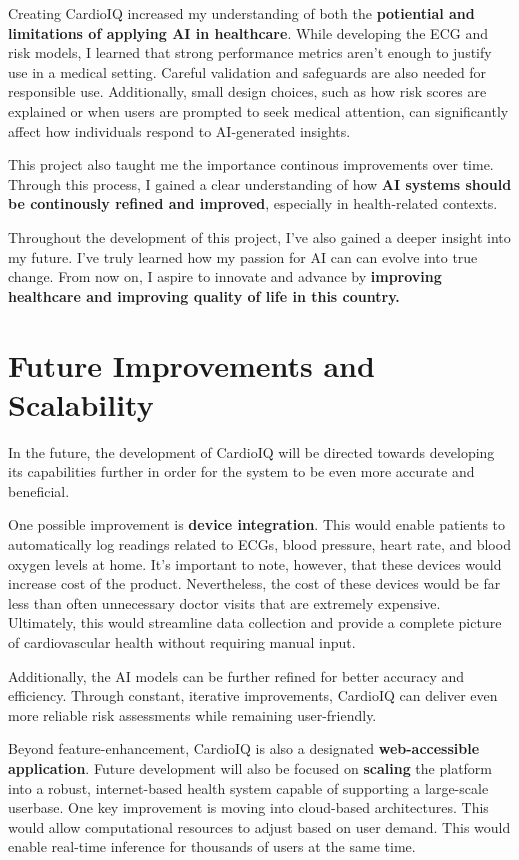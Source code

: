 \documentclass[12pt]{article}
\begin{document}
Creating CardioIQ increased my understanding of both the \textbf{potiential and limitations of applying AI in healthcare}. While developing the ECG and risk models, I learned that strong performance metrics aren't enough to justify use in a medical setting. Careful validation and safeguards are also needed for responsible use. Additionally, small design choices, such as how risk scores are explained or when users are prompted to seek medical attention, can significantly affect how individuals respond to AI-generated insights. 

This project also taught me the importance continous improvements over time. Through this process, I gained a clear understanding of how \textbf{AI systems should be continously refined and improved}, especially in health-related contexts. 

Throughout the development of this project, I've also gained a deeper insight into my future. I've truly learned how my passion for AI can can evolve into true change. From now on, I aspire to innovate and advance by \textbf{improving healthcare and improving quality of life in this country.}
 
\section*{Future Improvements and Scalability}

In the future, the development of CardioIQ will be directed towards developing its capabilities further in order for the system to be even more accurate and beneficial.

One possible improvement is \textbf{device integration}. This would enable patients to automatically log readings related to ECGs, blood pressure, heart rate, and blood oxygen levels at home. It's important to note, however, that these devices would increase cost of the product. Nevertheless, the cost of these devices would be far less than often unnecessary doctor visits that are extremely expensive. Ultimately, this would streamline data collection and provide a complete picture of cardiovascular health without requiring manual input. 

Additionally, the AI models can be further refined for better accuracy and efficiency. Through constant, iterative improvements, CardioIQ can deliver even more reliable risk assessments while remaining user-friendly.  

Beyond feature-enhancement, CardioIQ is also a designated \textbf{web-accessible application}. Future development will also be focused on \textbf{scaling} the platform into a robust, internet-based health system capable of supporting a large-scale userbase. One key improvement is moving into cloud-based architectures. This would allow computational resources to adjust based on user demand. This would enable real-time inference for thousands of users at the same time. 
\end{document}
